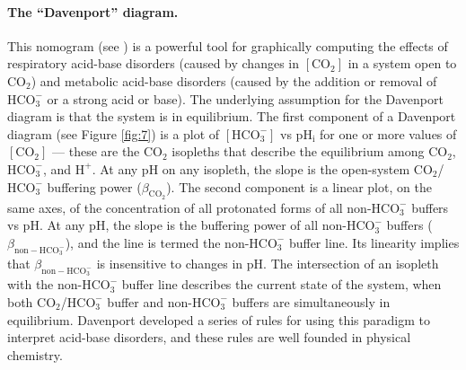 \documentclass[fleqn,10pt]{physiome}
\begin{document}
\paragraph{The ``Davenport'' diagram.} This nomogram (see \cite{boron2016medical}) is a powerful tool for graphically computing the effects of respiratory acid-base disorders (caused by changes in $\mathrm{[CO_2]}$ in a system open to $\mathrm{CO_2}$) and metabolic acid-base disorders (caused by the addition or removal of $\mathrm{HCO_3^-}$ or a strong acid or base). The underlying assumption for the Davenport diagram is that the system is in equilibrium. The first component of a Davenport diagram (see Figure \ref{fig:7}) is a plot of $\mathrm{[HCO_3^-]}$ vs $\mathrm{pH_i}$ for one or more values of $\mathrm{[CO_2]}$ --- these are the $\mathrm{CO_2}$ isopleths that describe the equilibrium among $\mathrm{CO_2}$, $\mathrm{HCO_3^-}$, and $\mathrm{H^+}$. At any $\mathrm{pH}$ on any isopleth, the slope is the open-system $\mathrm{CO_2}$/$\mathrm{HCO_3^-}$ buffering power ($\beta_\mathrm{CO_2}$). The second component is a linear plot, on the same axes, of the concentration of all protonated forms of all non-$\mathrm{HCO_3^-}$ buffers vs $\mathrm{pH}$. At any $\mathrm{pH}$, the slope is the buffering power of all non-$\mathrm{HCO_3^-}$ buffers ($\beta_\mathrm{non-HCO_3^-}$), and the line is termed the non-$\mathrm{HCO_3^-}$ buffer line. Its linearity implies that $\beta_\mathrm{non-HCO_3^-}$ is insensitive to changes in $\mathrm{pH}$. The intersection of an isopleth with the non-$\mathrm{HCO_3^-}$ buffer line describes the current state of the system, when both $\mathrm{CO_2}$/$\mathrm{HCO_3^-}$ buffer and non-$\mathrm{HCO_3^-}$ buffers are simultaneously in equilibrium. Davenport developed a series of rules for using this paradigm to interpret acid-base disorders, and these rules are well founded in physical chemistry.\\
\end{document}
